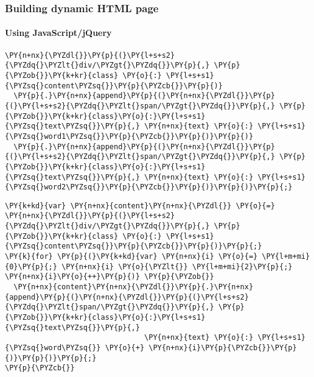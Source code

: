 \begin{frame}[fragile]
  \frametitle{Building dynamic HTML page}
  \framesubtitle{Using JavaScript/jQuery}
\begin{Verbatim}[commandchars=\\\{\}]
\PY{n+nx}{\PYZdl{}}\PY{p}{(}\PY{l+s+s2}{\PYZdq{}\PYZlt{}div/\PYZgt{}\PYZdq{}}\PY{p}{,} \PY{p}{\PYZob{}}\PY{k+kr}{class} \PY{o}{:} \PY{l+s+s1}{\PYZsq{}content\PYZsq{}}\PY{p}{\PYZcb{}}\PY{p}{)}
  \PY{p}{.}\PY{n+nx}{append}\PY{p}{(}\PY{n+nx}{\PYZdl{}}\PY{p}{(}\PY{l+s+s2}{\PYZdq{}\PYZlt{}span/\PYZgt{}\PYZdq{}}\PY{p}{,} \PY{p}{\PYZob{}}\PY{k+kr}{class}\PY{o}{:}\PY{l+s+s1}{\PYZsq{}text\PYZsq{}}\PY{p}{,} \PY{n+nx}{text} \PY{o}{:} \PY{l+s+s1}{\PYZsq{}word1\PYZsq{}}\PY{p}{\PYZcb{}}\PY{p}{)}\PY{p}{)}
  \PY{p}{.}\PY{n+nx}{append}\PY{p}{(}\PY{n+nx}{\PYZdl{}}\PY{p}{(}\PY{l+s+s2}{\PYZdq{}\PYZlt{}span/\PYZgt{}\PYZdq{}}\PY{p}{,} \PY{p}{\PYZob{}}\PY{k+kr}{class}\PY{o}{:}\PY{l+s+s1}{\PYZsq{}text\PYZsq{}}\PY{p}{,} \PY{n+nx}{text} \PY{o}{:} \PY{l+s+s1}{\PYZsq{}word2\PYZsq{}}\PY{p}{\PYZcb{}}\PY{p}{)}\PY{p}{)}\PY{p}{;}

\end{Verbatim}

\pause

\begin{Verbatim}[commandchars=\\\{\}]
\PY{k+kd}{var} \PY{n+nx}{content}\PY{n+nx}{\PYZdl{}} \PY{o}{=} \PY{n+nx}{\PYZdl{}}\PY{p}{(}\PY{l+s+s2}{\PYZdq{}\PYZlt{}div/\PYZgt{}\PYZdq{}}\PY{p}{,} \PY{p}{\PYZob{}}\PY{k+kr}{class} \PY{o}{:} \PY{l+s+s1}{\PYZsq{}content\PYZsq{}}\PY{p}{\PYZcb{}}\PY{p}{)}\PY{p}{;}
\PY{k}{for} \PY{p}{(}\PY{k+kd}{var} \PY{n+nx}{i} \PY{o}{=} \PY{l+m+mi}{0}\PY{p}{;} \PY{n+nx}{i} \PY{o}{\PYZlt{}} \PY{l+m+mi}{2}\PY{p}{;} \PY{n+nx}{i}\PY{o}{++}\PY{p}{)} \PY{p}{\PYZob{}}
  \PY{n+nx}{content}\PY{n+nx}{\PYZdl{}}\PY{p}{.}\PY{n+nx}{append}\PY{p}{(}\PY{n+nx}{\PYZdl{}}\PY{p}{(}\PY{l+s+s2}{\PYZdq{}\PYZlt{}span/\PYZgt{}\PYZdq{}}\PY{p}{,} \PY{p}{\PYZob{}}\PY{k+kr}{class}\PY{o}{:}\PY{l+s+s1}{\PYZsq{}text\PYZsq{}}\PY{p}{,}
                                \PY{n+nx}{text} \PY{o}{:} \PY{l+s+s1}{\PYZsq{}word\PYZsq{}} \PY{o}{+} \PY{n+nx}{i}\PY{p}{\PYZcb{}}\PY{p}{)}\PY{p}{)}\PY{p}{;}
\PY{p}{\PYZcb{}}
\end{Verbatim}
\end{frame}


